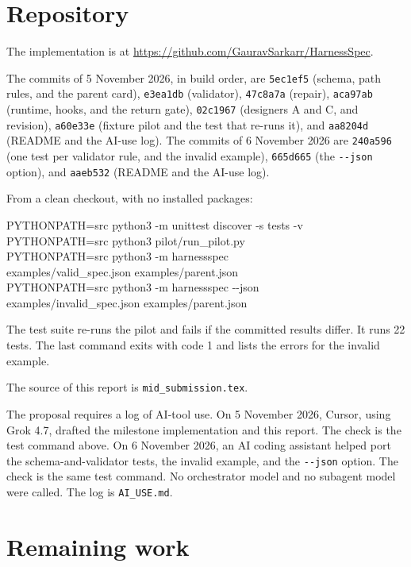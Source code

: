 \documentclass[10pt,a4paper]{article}
\begin{document}
\section{Repository}

The implementation is at \url{https://github.com/GauravSarkarr/HarnessSpec}.

The commits of 5 November 2026, in build order, are \texttt{5ec1ef5} (schema, path rules, and the parent card), \texttt{e3ea1db} (validator), \texttt{47c8a7a} (repair), \texttt{aca97ab} (runtime, hooks, and the return gate), \texttt{02c1967} (designers A and C, and revision), \texttt{a60e33e} (fixture pilot and the test that re-runs it), and \texttt{aa8204d} (README and the AI-use log). The commits of 6 November 2026 are \texttt{240a596} (one test per validator rule, and the invalid example), \texttt{665d665} (the \texttt{-{}-json} option), and \texttt{aaeb532} (README and the AI-use log).

From a clean checkout, with no installed packages:

{\footnotesize\ttfamily
\begin{flushleft}
PYTHONPATH=src python3 -m unittest discover -s tests -v\\
PYTHONPATH=src python3 pilot/run\_pilot.py\\
PYTHONPATH=src python3 -m harnessspec \\
examples/valid\_spec.json examples/parent.json\\
PYTHONPATH=src python3 -m harnessspec -{}-json \\
examples/invalid\_spec.json examples/parent.json
\end{flushleft}
}

\noindent The test suite re-runs the pilot and fails if the committed results differ. It runs 22 tests. The last command exits with code 1 and lists the errors for the invalid example.

\noindent The source of this report is \texttt{mid\_submission.tex}.

The proposal requires a log of AI-tool use. On 5 November 2026, Cursor, using Grok 4.7, drafted the milestone implementation and this report. The check is the test command above. On 6 November 2026, an AI coding assistant helped port the schema-and-validator tests, the invalid example, and the \texttt{-{}-json} option. The check is the same test command. No orchestrator model and no subagent model were called. The log is \texttt{AI\_USE.md}.

\section{Remaining work}
\end{document}

